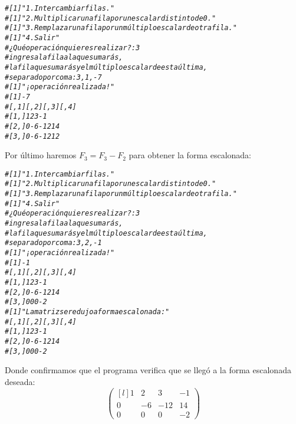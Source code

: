 \documentclass{article}\usepackage[]{graphicx}\usepackage[]{color}
\makeatletter
\newcommand{\hlcom}[1]{\textcolor[rgb]{0.678,0.584,0.686}{\textit{#1}}}%
\newenvironment{kframe}{%
 \def\at@end@of@kframe{}%
 \ifinner\ifhmode%
  \def\at@end@of@kframe{\end{minipage}}%
  \begin{minipage}{\columnwidth}%
 \fi\fi%
 \def\FrameCommand##1{\hskip\@totalleftmargin \hskip-\fboxsep
 \colorbox{shadecolor}{##1}\hskip-\fboxsep
     \hskip-\linewidth \hskip-\@totalleftmargin \hskip\columnwidth}%
 \MakeFramed {\advance\hsize-\width
   \@totalleftmargin\z@ \linewidth\hsize
   \@setminipage}}%
 {\par\unskip\endMakeFramed%
 \at@end@of@kframe}
\newenvironment{knitrout}{}{} %
\makeatother
\begin{document}
\begin{knitrout}
\color{fgcolor}\begin{kframe}
\begin{alltt}
\hlcom{# [1] "1. Intercambiar filas."}
\hlcom{# [1] "2. Multiplicar una fila por un escalar distinto de 0."}
\hlcom{# [1] "3. Remplazar una fila por un múltiplo escalar de otra fila."}
\hlcom{# [1] "4. Salir"}
\hlcom{# ¿Qué operación quieres realizar?:3}
\hlcom{# ingresa la fila a la que sumarás,}
\hlcom{#                    la fila que sumarás y el múltiplo escalar de esta última,}
\hlcom{#                    separado por coma:3,1,-7}
\hlcom{# [1] "¡operación realizada!"}
\hlcom{# [1] -7}
\hlcom{#      [,1] [,2] [,3] [,4]}
\hlcom{# [1,]    1    2    3   -1}
\hlcom{# [2,]    0   -6  -12   14}
\hlcom{# [3,]    0   -6  -12   12}
\end{alltt}
\end{kframe}
\end{knitrout}
Por último haremos $F_3 = F_3 - F_2$ para obtener la forma escalonada:
\begin{knitrout}
\color{fgcolor}\begin{kframe}
\begin{alltt}
\hlcom{# [1] "1. Intercambiar filas."}
\hlcom{# [1] "2. Multiplicar una fila por un escalar distinto de 0."}
\hlcom{# [1] "3. Remplazar una fila por un múltiplo escalar de otra fila."}
\hlcom{# [1] "4. Salir"}
\hlcom{# ¿Qué operación quieres realizar?:3}
\hlcom{# ingresa la fila a la que sumarás,}
\hlcom{#                    la fila que sumarás y el múltiplo escalar de esta última,}
\hlcom{#                    separado por coma:3,2,-1}
\hlcom{# [1] "¡operación realizada!"}
\hlcom{# [1] -1}
\hlcom{#      [,1] [,2] [,3] [,4]}
\hlcom{# [1,]    1    2    3   -1}
\hlcom{# [2,]    0   -6  -12   14}
\hlcom{# [3,]    0    0    0   -2}
\hlcom{# [1] "La matriz se redujo a forma escalonada:"}
\hlcom{#      [,1] [,2] [,3] [,4]}
\hlcom{# [1,]    1    2    3   -1}
\hlcom{# [2,]    0   -6  -12   14}
\hlcom{# [3,]    0    0    0   -2}
\end{alltt}
\end{kframe}
\end{knitrout}
Donde confirmamos que el programa verifica que se llegó a la forma escalonada deseada:
 \begin{equation*}
\begin{pmatrix*}[l]
1 & 2 & 3 & -1\\
0 & -6 & -12 & 14\\
0 & 0 & 0 & -2
\end{pmatrix*}
\end{equation*}
\end{document}
